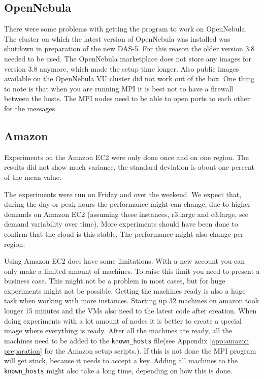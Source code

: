 \subsection{OpenNebula}
There were some problems with getting the program to work on OpenNebula. The cluster on which the latest version of OpenNebula was installed was shutdown in preparation of the new DAS-5. For this reason the older version 3.8 needed to be used. The OpenNebula marketplace does not store any images for version 3.8 anymore, which made the setup time longer. Also public images available on the OpenNebula VU cluster did not work out of the box.
One thing to note is that when you are running MPI it is best not to have a firewall between the hosts. The MPI nodes need to be able to open ports to each other for the messages.  

\subsection{Amazon}
Experiments on the Amazon EC2 were only done once and on one region. The results did not show much variance, the standard deviation is about one percent of the mean value.

The experiments were run on Friday and over the weekend. We expect that, during the day or peak hours the performance might can change, due to higher demands on Amazon EC2 (assuming these instances, r3.large and c3.large, see demand variability over time). More experiments should have been done to confirm that the cloud is this stable. The performance might also change per region. 

Using Amazon EC2 does have some limitations. With a new account you can only make a limited amount of machines. To raise this limit you need to present a business case. This might not be a problem in most cases, but for huge experiments might not be possible. Getting the machines ready is also a huge task when working with more instances. Starting up 32 machines on amazon took longer 15 minutes and the VMs also need to the latest code after creation. When doing experiments with a lot amount of nodes it is better to create a special image where everything is ready. After all the machines are ready, all the machines need to be added to the \texttt{known\_hosts} file(see Appendix \ref{app:amazon preparation} for the Amazon setup scripts.). If this is not done the MPI program will get stuck, because it needs to accept a key. Adding all machines to the \texttt{known\_hosts} might also take a long time, depending on how this is done.


